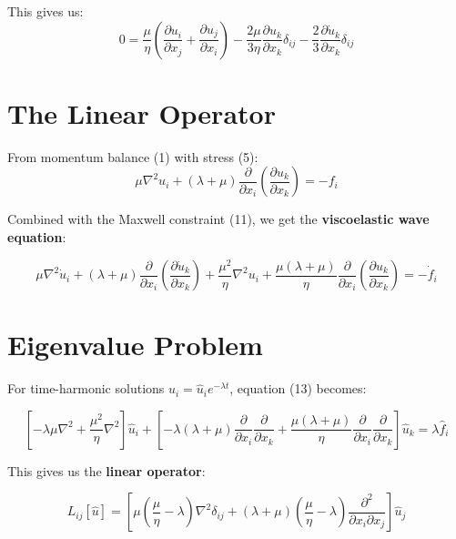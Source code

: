\documentclass{article}
\begin{document}
This gives us:
\begin{equation}
0 = \frac{\mu}{\eta}\left(\frac{\partial u_i}{\partial x_j} + \frac{\partial u_j}{\partial x_i}\right) - \frac{2\mu}{3\eta}\frac{\partial u_k}{\partial x_k}\delta_{ij} - \frac{2}{3}\frac{\partial \dot{u}_k}{\partial x_k}\delta_{ij}
\end{equation}

\section{The Linear Operator}

From momentum balance (1) with stress (5):
\begin{equation}
\mu\nabla^2 u_i + (\lambda + \mu)\frac{\partial}{\partial x_i}\left(\frac{\partial u_k}{\partial x_k}\right) = -f_i
\end{equation}

Combined with the Maxwell constraint (11), we get the \textbf{viscoelastic wave equation}:

\begin{equation}
\boxed{
\mu\nabla^2 \dot{u}_i + (\lambda + \mu)\frac{\partial}{\partial x_i}\left(\frac{\partial \dot{u}_k}{\partial x_k}\right) + \frac{\mu^2}{\eta}\nabla^2 u_i + \frac{\mu(\lambda + \mu)}{\eta}\frac{\partial}{\partial x_i}\left(\frac{\partial u_k}{\partial x_k}\right) = -\dot{f}_i
}
\end{equation}

\section{Eigenvalue Problem}

For time-harmonic solutions $u_i = \hat{u}_i e^{-\lambda t}$, equation (13) becomes:

\begin{equation}
\left[-\lambda\mu\nabla^2 + \frac{\mu^2}{\eta}\nabla^2\right]\hat{u}_i + \left[-\lambda(\lambda + \mu)\frac{\partial}{\partial x_i}\frac{\partial}{\partial x_k} + \frac{\mu(\lambda + \mu)}{\eta}\frac{\partial}{\partial x_i}\frac{\partial}{\partial x_k}\right]\hat{u}_k = \lambda\hat{f}_i
\end{equation}

This gives us the \textbf{linear operator}:

\begin{equation}
\boxed{
L_{ij}[\hat{u}] = \left[\mu\left(\frac{\mu}{\eta} - \lambda\right)\nabla^2\delta_{ij} + (\lambda + \mu)\left(\frac{\mu}{\eta} - \lambda\right)\frac{\partial^2}{\partial x_i \partial x_j}\right]\hat{u}_j
}
\end{equation}
\end{document}
